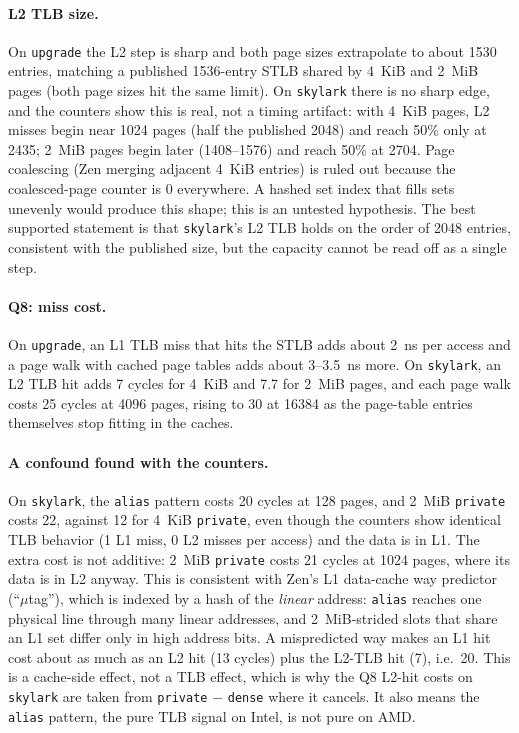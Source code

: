 \documentclass[11pt]{article}
\newcommand{\up}{\texttt{upgrade}}
\newcommand{\sk}{\texttt{skylark}}
\begin{document}
\paragraph{L2 TLB size.} On \up{} the L2 step is sharp and both page sizes
extrapolate to about 1530 entries, matching a published 1536-entry STLB
shared by 4~KiB and 2~MiB pages (both page sizes hit the same limit). On \sk{}
there is no sharp edge, and the counters show this is real, not a timing
artifact: with 4~KiB pages, L2 misses begin near 1024 pages (half the
published 2048) and reach 50\% only at 2435; 2~MiB pages begin later
(1408--1576) and reach 50\% at 2704. Page coalescing (Zen merging adjacent
4~KiB entries) is ruled out because the coalesced-page counter is 0
everywhere. A hashed set index that fills sets unevenly would produce this
shape; this is an untested hypothesis. The best supported statement is
that \sk{}'s L2 TLB holds on the order of 2048 entries, consistent with the
published size, but the capacity cannot be read off as a single step.

\paragraph{Q8: miss cost.} On \up, an L1 TLB miss that hits the STLB adds
about 2~ns per access and a page walk with cached page tables adds about
3--3.5~ns more. On \sk, an L2 TLB hit adds 7 cycles for 4~KiB and 7.7 for
2~MiB pages, and each page walk costs 25 cycles at 4096 pages, rising to 30
at 16384 as the page-table entries themselves stop fitting in the caches.

\paragraph{A confound found with the counters.} On \sk{}, the \texttt{alias}
pattern costs 20 cycles at 128 pages, and 2~MiB \texttt{private} costs 22,
against 12 for 4~KiB \texttt{private}, even though the counters show
identical TLB behavior (1 L1 miss, 0 L2 misses per access) and the data is
in L1. The extra cost is not additive: 2~MiB \texttt{private} costs 21
cycles at 1024 pages, where its data is in L2 anyway. This is consistent
with Zen's L1 data-cache way predictor (``$\mu$tag''), which is indexed by a
hash of the \emph{linear} address: \texttt{alias} reaches one physical line
through many linear addresses, and 2~MiB-strided slots that share an L1 set
differ only in high address bits. A mispredicted way makes an L1 hit cost
about as much as an L2 hit (13 cycles) plus the L2-TLB hit (7), i.e.\ 20.
This is a cache-side effect, not a TLB effect, which is why the Q8 L2-hit
costs on \sk{} are taken from \texttt{private} $-$ \texttt{dense} where it
cancels. It also means the \texttt{alias} pattern, the pure TLB signal on
Intel, is not pure on AMD.
\end{document}
